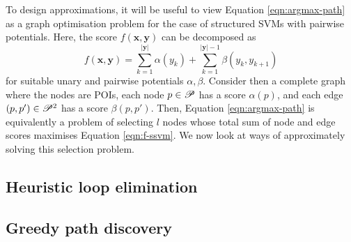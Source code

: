 
To design approximations, it will be useful to view Equation \ref{eqn:argmax-path} as a graph optimisation problem
for the case of structured SVMs with pairwise potentials.
Here, the score $f(\mathbf{x}, \mathbf{y})$ can be decomposed as
\begin{equation}
	\label{eqn:f-ssvm}
	f(\mathbf{x}, \mathbf{y}) = \sum_{k = 1}^{|\mathbf{y}|} \alpha( y_k ) + \sum_{k = 1}^{|\mathbf{y}| - 1} \beta( y_k, y_{k+1} )
\end{equation}
for suitable unary and pairwise potentials $\alpha, \beta$.
Consider then a complete graph where the nodes are POIs, each node $p \in \mathscr{P}$ has a score $\alpha( p )$, and each edge $(p, p') \in \mathscr{P}^2$ has a score $\beta( p, p' )$.
Then, Equation \ref{eqn:argmax-path} is equivalently a problem of selecting $l$ nodes whose
total sum of node and edge scores maximises Equation \ref{eqn:f-ssvm}.
We now look at ways of approximately solving this selection problem.

\subsection{Heuristic loop elimination}
\label{sec:loop-elim}


\subsection{Greedy path discovery}
\label{sec:greedy}


% 
